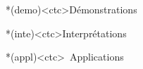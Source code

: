 \documentclass[../../main/main.tex]{subfiles}
\begin{document}
\begin{tcn}
	\begin{tcn}*(demo)<ctc>{Démonstrations}
	\end{tcn}
	\begin{tcn}*(inte)<ctc>{Interprétations}
	\end{tcn}
	\begin{tcn}*(appl)<ctc>{\iconappl~Applications}
	\end{tcn}

\end{tcn}
\end{document}
